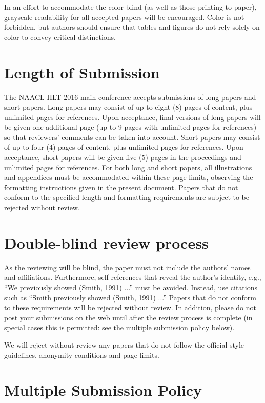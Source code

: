 \documentclass[11pt,letterpaper]{article}
\begin{document}
In an effort to accommodate the color-blind (as well as those printing
to paper), grayscale readability for all accepted papers will be
encouraged.  Color is not forbidden, but authors should ensure that
tables and figures do not rely solely on color to convey critical
distinctions.

\section{Length of Submission}
\label{sec:length}

The NAACL HLT 2016 main conference accepts submissions of long papers and short papers.  Long papers may consist of up to eight (8) pages of content, plus unlimited pages for references. Upon acceptance, final versions of long papers will be given one additional page (up to 9 pages with unlimited pages for references) so that reviewers' comments can be taken into account.  Short papers may consist of up to four (4) pages of content, plus unlimited pages for references. Upon acceptance, short papers will be given five (5) pages in the proceedings and unlimited pages for references.  For both long and short papers, all illustrations and appendices must be accommodated within these page limits, observing the formatting instructions given in the present document.  Papers that do not conform to the specified length and formatting requirements are subject to be rejected without review.


\section{Double-blind review process}
\label{sec:blind}

As the reviewing will be blind, the paper must not include the
authors' names and affiliations.  Furthermore, self-references that
reveal the author's identity, e.g., ``We previously showed (Smith,
1991) ...'' must be avoided. Instead, use citations such as ``Smith
previously showed (Smith, 1991) ...'' Papers that do not conform to
these requirements will be rejected without review. In addition,
please do not post your submissions on the web until after the
review process is complete (in special cases this is permitted: see 
the multiple submission policy below).

We will reject without review any papers that do not follow the
official style guidelines, anonymity conditions and page limits.

\section{Multiple Submission Policy}
\end{document}

